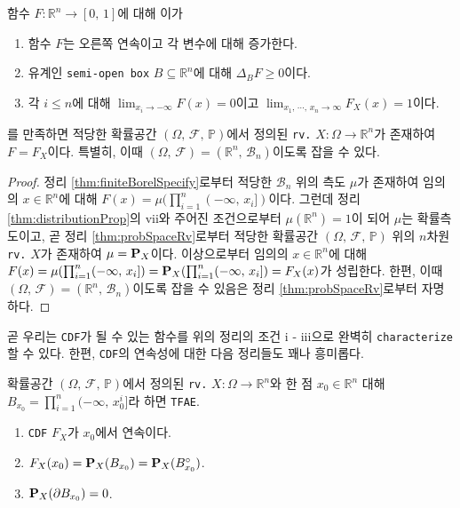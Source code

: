 \begin{theorem}
    함수 $F:\mathbb{R}^n\to[0,\,1]$에 대해 이가
    \begin{enumerate}
        \item 함수 $F$는 오른쪽 연속이고 각 변수에 대해 증가한다.
        \item 유계인 \texttt{semi-open box} $B\subseteq\mathbb{R}^n$에 대해 $\Delta_BF\geq0$이다.
        \item 각 $i\leq n$에 대해 $\lim_{x_i\to-\infty}F(x)=0$이고 $\lim_{x_1,\,\cdots,\,x_n\to\infty}F_X(x)=1$이다.
    \end{enumerate}
    를 만족하면 적당한 확률공간 $(\Omega,\,\mathcal{F},\,\mathbb{P})$에서 정의된 \texttt{rv.} $X:\Omega\to\mathbb{R}^n$가 존재하여 $F=F_X$이다. 특별히, 이때 $(\Omega,\,\mathcal{F})=(\mathbb{R}^n,\,\mathcal{B}_n)$이도록 잡을 수 있다.
\end{theorem}

\begin{proof}
    정리 \ref{thm:finiteBorelSpecify}로부터 적당한 $\mathcal{B}_n$ 위의 측도 $\mu$가 존재하여 임의의 $x\in\mathbb{R}^n$에 대해 $F(x)=\mu(\prod_{i=1}^n(-\infty,\,x_i])$이다. 그런데 정리 \ref{thm:distributionProp}의 vii와 주어진 조건으로부터 $\mu(\mathbb{R}^n)=1$이 되어 $\mu$는 확률측도이고, 곧 정리 \ref{thm:probSpaceRv}로부터 적당한 확률공간 $(\Omega,\,\mathcal{F},\,\mathbb{P})$ 위의 $n$차원 \texttt{rv.} $X$가 존재하여 $\mu=\mathbf{P}_X$이다. 이상으로부터 임의의 $x\in\mathbb{R}^n$에 대해 $F(x)=\mu(\prod_{i=1}^n(-\infty,\,x_i])=\mathbf{P}_X(\prod_{i=1}^n(-\infty,\,x_i])=F_X(x)$가 성립한다. 한편, 이때 $(\Omega,\,\mathcal{F})=(\mathbb{R}^n,\,\mathcal{B}_n)$이도록 잡을 수 있음은 정리 \ref{thm:probSpaceRv}로부터 자명하다.
\end{proof}

곧 우리는 \texttt{CDF}가 될 수 있는 함수를 위의 정리의 조건 i - iii으로 완벽히 \texttt{characterize}할 수 있다. 한편, \texttt{CDF}의 연속성에 대한 다음 정리들도 꽤나 흥미롭다.

\begin{theorem}\label{thm:CDFContinuous}
    확률공간 $(\Omega,\,\mathcal{F},\,\mathbb{P})$에서 정의된 \texttt{rv.} $X:\Omega\to\mathbb{R}^n$와 한 점 $x_0\in\mathbb{R}^n$ 대해 $B_{x_0}=\prod_{i=1}^n(-\infty,\,x_0^i]$라 하면 \texttt{TFAE}.
    \begin{enumerate}
        \item \texttt{CDF} $F_X$가 $x_0$에서 연속이다.
        \item $F_X(x_0)=\mathbf{P}_X(B_{x_0})=\mathbf{P}_X(B_{x_0}^\circ)$.
        \item $\mathbf{P}_X(\partial B_{x_0})=0$.
    \end{enumerate}
\end{theorem}

